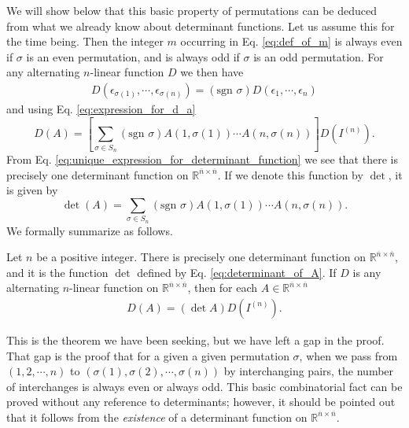 \documentclass[12pt,letterpaper,reqno]{article}
\numberwithin{equation}{section}
\newcommand{\ti}[1]{\textit{#1}}
\begin{document}
We will show below that this basic property of permutations can be deduced from what we already know about determinant functions. Let us assume this for the time being. Then the integer $m$ occurring in Eq. \eqref{eq:def_of_m} is always even if $\sigma$ is an even permutation, and is always odd if $\sigma$ is an odd permutation. For any alternating $n$-linear function $D$ we then have 
\begin{align*}
	D(\epsilon_{\sigma(1)},\cdots,\epsilon_{\sigma(n)})=(\text{sgn }\sigma)D(\epsilon_1,\cdots,\epsilon_n)
\end{align*}
and using Eq. \eqref{eq:expression_for_d_a}
\begin{equation}\label{eq:unique_expression_for_determinant_function}
	D(A)=\left[\sum_{\sigma \in S_n}(\text{sgn }\sigma)A(1,\sigma(1))\cdots A(n,\sigma(n))\right]D(I^{(n)}).
\end{equation}
From Eq. \eqref{eq:unique_expression_for_determinant_function} we see that there is precisely one determinant function on $\mathbb{R}^{\overline{n} \times \overline{n}}$. If we denote this function by $\det$, it is given by
\begin{equation}\label{eq:determinant_of_A}
	\det (A)=\sum_{\sigma \in S_n}(\text{sgn }\sigma)A(1,\sigma(1))\cdots A(n,\sigma(n)).
\end{equation}
We formally summarize as follows.
\begin{thm}[$\det A$]\label{thm:det_a}
Let $n$ be a positive integer. There is precisely one determinant function on $\mathbb{R}^{\overline{n} \times \overline{n}}$, and it is the function $\det$ defined by Eq. \eqref{eq:determinant_of_A}. If $D$ is any alternating $n$-linear function on $\mathbb{R}^{\overline{n} \times \overline{n}}$, then for each $A \in \mathbb{R}^{\overline{n} \times \overline{n}}$
\begin{align*}
	D(A)=(\det A)D(I^{(n)}).
\end{align*}
\end{thm}

This is the theorem we have been seeking, but we have left a gap in the proof. That gap is the proof that for a given a given permutation $\sigma$, when we pass from $(1,2,\cdots,n)$ to $(\sigma(1),\sigma(2),\cdots,\sigma(n))$ by interchanging pairs, the number of interchanges is always even or always odd. This basic combinatorial fact can be proved without any reference to determinants; however, it should be pointed out that it follows from the \ti{existence} of a determinant function on $\mathbb{R}^{\overline{n} \times \overline{n}}$. 
\end{document}
